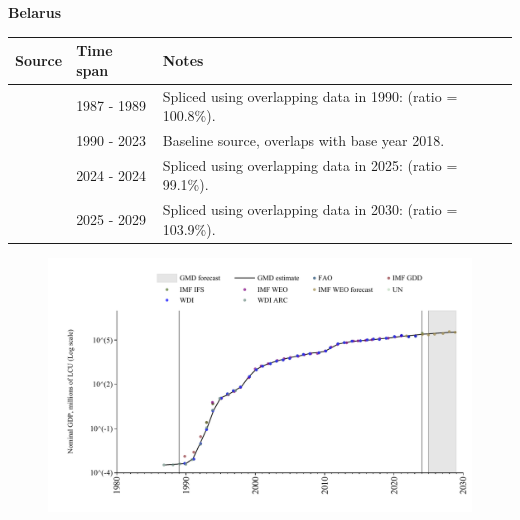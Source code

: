 \documentclass[12pt,a4paper,landscape]{article}
\begin{document}
\begin{adjustbox}{max totalsize={\paperwidth}{\paperheight},center}
\begin{minipage}[t][\textheight][t]{\textwidth}
\vspace*{0.5cm}
{}
\begin{center}
{\Large\bfseries Belarus}
\end{center}
\vspace{0.5cm}
\begin{table}[H]
\centering
\small
\begin{tabular}{|l|l|l|}
\hline
\textbf{Source} & \textbf{Time span} & \textbf{Notes} \\
\hline
\rowcolor{white}\cite{WDI_ARC}& 1987 - 1989 &Spliced using overlapping data in 1990: (ratio = 100.8\%).\\
\rowcolor{lightgray}\cite{WDI}& 1990 - 2023 &Baseline source, overlaps with base year 2018.\\
\rowcolor{white}\cite{IMF_IFS}& 2024 - 2024 &Spliced using overlapping data in 2025: (ratio = 99.1\%).\\
\rowcolor{lightgray}\cite{IMF_WEO_forecast}& 2025 - 2029 &Spliced using overlapping data in 2030: (ratio = 103.9\%).\\
\hline
\end{tabular}
\end{table}
\begin{figure}[H]
\centering
\includegraphics[width=\textwidth,height=0.6\textheight,keepaspectratio]{graphs/BLR_nGDP.pdf}
\end{figure}
\end{minipage}
\end{adjustbox}
\end{document}
